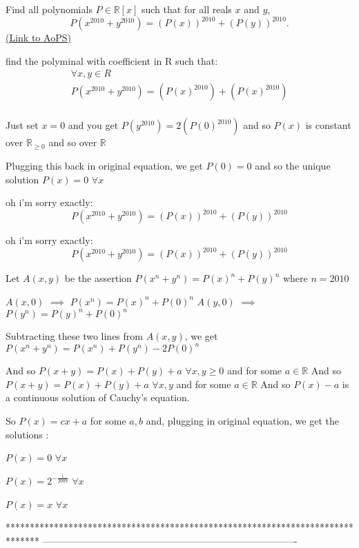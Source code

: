 \begin{problem}
	Find all polynomials $P \in \mathbb R[x]$ such that for all reals $x$ and $y$,
\[P({x^{2010}} + {y^{2010}}) = {(P(x))^{2010}} + {(P(y))^{2010}}.\]
	\flushright \href{https://artofproblemsolving.com/community/c6h407709}{(Link to AoPS)}
\end{problem}



\begin{solution}
	\begin{tcolorbox}find the polyminal with coefficient in R such that:
\[\begin{array}{l}
 \forall x,y \in R \\ 
 P({x^{2010}} + {y^{2010}}) = (P{(x)^{2010}}) + (P{(x)^{2010}}) \\ 
 \end{array}\]\end{tcolorbox}
Just set $x=0$ and you get $P(y^{2010}) = 2(P(0)^{2010}) $ and so $P(x)$ is constant over $\mathbb R_{\ge 0}$ and so over $\mathbb R$

Plugging this back in original equation, we get $P(0)=0$ and so the unique solution $\boxed{P(x)=0}$ $\forall x$
\end{solution}



\begin{solution}
	oh i'm sorry   exactly:
\[P({x^{2010}} + {y^{2010}}) = {(P(x))^{2010}} + {(P(y))^{2010}}\]
\end{solution}



\begin{solution}
	\begin{tcolorbox}oh i'm sorry   exactly:
\[P({x^{2010}} + {y^{2010}}) = {(P(x))^{2010}} + {(P(y))^{2010}}\]\end{tcolorbox}
Let $A(x,y)$ be the assertion $P(x^n+y^n)=P(x)^n+P(y)^n$ where $n=2010$

$A(x,0)$ $\implies$ $P(x^n)=P(x)^n+P(0)^n$
$A(y,0)$ $\implies$ $P(y^n)=P(y)^n+P(0)^n$

Subtracting these two lines from $A(x,y)$, we get $P(x^n+y^n)=P(x^n)+P(y^n)-2P(0)^n$

And so $P(x+y)=P(x)+P(y)+a$ $\forall x,y\ge 0$ and for some $a\in\mathbb R$
And so $P(x+y)=P(x)+P(y)+a$ $\forall x,y$ and for some $a\in\mathbb R$
And so $P(x)-a$ is a continuous solution of Cauchy's equation.

So $P(x)=cx+a$ for some $a,b$ and, plugging in original equation, we get the solutions :

$P(x)=0$ $\forall x$

$P(x)=2^{-\frac 1{2009}}$ $\forall x$

$P(x)=x$ $\forall x$
\end{solution}
*******************************************************************************
-------------------------------------------------------------------------------

